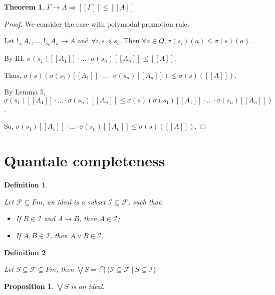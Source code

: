 \documentclass[a4paper]{article}
\newtheorem{theorem}{Theorem}
\newtheorem{prop}{Proposition}
\newtheorem{defin}{Definition}
\begin{document}
\begin{theorem}
  $\Gamma \rightarrow A \Rightarrow [\![\Gamma]\!] \leq [\![A]\!]$
\end{theorem}

\begin{proof}
We consider the case with polymodal promotion rule.

Let $!_{s_1} A_1, \dots, !_{s_n} A_n \rightarrow A$ and $\forall i, s \preceq s_i$.
Then $\forall a \in Q, \sigma(s_i)(a) \leq \sigma(s)(a)$.

By IH, $\sigma(s_1)[\![A_1]\!] \cdot \dots \cdot \sigma(s_n) [\![A_n]\!] \leq [\![A]\!]$.

Thus, $\sigma(s)(\sigma(s_1)[\![A_1]\!] \cdot \dots \cdot \sigma(s_n) [\![A_n]\!]) \leq \sigma(s)([\![A]\!])$.

By Lemma 5, $\sigma(s_1)[\![A_1]\!] \cdot \dots \cdot \sigma(s_n) [\![A_n]\!] \leq \sigma(s)(\sigma(s_1)[\![A_1]\!] \cdot \dots \cdot \sigma(s_n) [\![A_n]\!])$.

So, $\sigma(s_1)[\![A_1]\!] \cdot \dots \cdot \sigma(s_n) [\![A_n]\!] \leq \sigma(s)([\![A]\!])$.
\end{proof}

\section{Quantale completeness}

\begin{defin}
$ $

  Let $\mathcal{F} \subseteq Fm$, an ideal is a subset $\mathcal{I} \subseteq \mathcal{F}$, such that:

\begin{itemize}
  \item If $B \in \mathcal{I}$ and $A \rightarrow B$, then $A \in \mathcal{I}$;
  \item If $A, B \in \mathcal{I}$, then $A \lor B \in \mathcal{I}$.
\end{itemize}
\end{defin}

\begin{defin}
$ $

  Let $S \subseteq \mathcal{F} \subseteq Fm$,
  then $\bigvee S = \bigcap \{ \mathcal{I} \subseteq \mathcal{F} \: | \: S \subseteq \mathcal{I} \}$
\end{defin}

\begin{prop}
  $\bigvee S$ is an ideal.
\end{prop}
\end{document}
